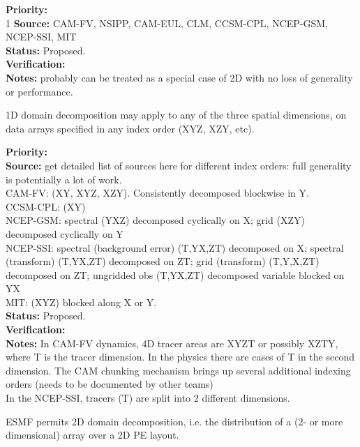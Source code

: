 \begin{reqlist}
{\bf Priority:} \\ 1
{\bf Source:} CAM-FV, NSIPP, CAM-EUL, CLM, CCSM-CPL, NCEP-GSM, NCEP-SSI, MIT \\
{\bf Status:} Proposed. \\
{\bf Verification:} \\
{\bf Notes:} probably can be treated as a special case of 2D with no
  loss of generality or performance.
\end{reqlist}


1D domain decomposition may apply to any of the three spatial
dimensions, on data arrays specified in any index order (XYZ, XZY,
etc).

\begin{reqlist}
{\bf Priority:} \\
{\bf Source:} get detailed list of sources here for different index
  orders: full generality is potentially a lot of work. \\
 CAM-FV: (XY, XYZ, XZY).  Consistently decomposed blockwise in Y. \\
 CCSM-CPL: (XY) \\
 NCEP-GSM: spectral (YXZ) decomposed cyclically on X;
           grid (XZY) decomposed cyclically on Y \\
 NCEP-SSI: spectral (background error) (T,YX,ZT) decomposed on X;
           spectral (transform) (T,YX,ZT) decomposed on ZT;
           grid (transform) (T,Y,X,ZT) decomposed on ZT;
           ungridded obs (T,YX,ZT) decomposed variable blocked on YX \\
 MIT: (XYZ) blocked along X or Y. \\
{\bf Status:} Proposed. \\
{\bf Verification:} \\
{\bf Notes:}  In CAM-FV dynamics, 4D tracer areas are XYZT or
	possibly XZTY, where T is the tracer dimension.  In the physics
	there are cases of T in the second dimension.  The CAM
	chunking mechanism brings up several additional indexing
	orders (needs to be documented by other teams) \\
        In the NCEP-SSI, tracers (T) are split into 2 different dimensions. 
\end{reqlist}


ESMF permits 2D domain decomposition, i.e. the distribution of a
(2- or more dimensional) array over a 2D PE layout.

